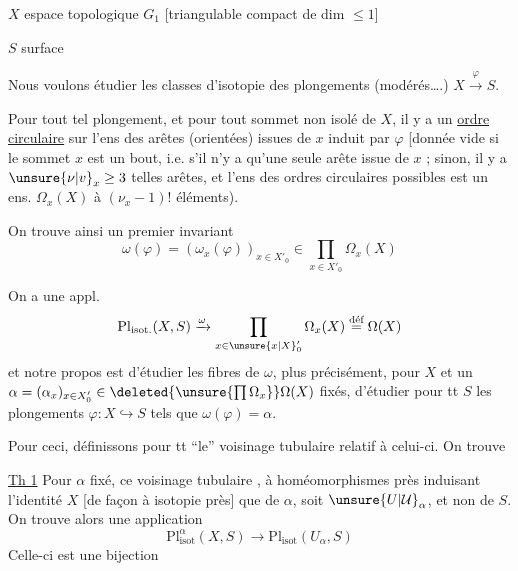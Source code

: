
$X$ espace topologique  $G_1$ [triangulable compact de dim $\leq1$]

$S$ surface 

Nous voulons étudier les classes d'isotopie des plongements (modérés\ldots.) $X\xrightarrow{\varphi}S$.

Pour tout tel plongement\inserted{$\varphi$}, et pour tout sommet   non isolé de $X$, il y a un \uline{ordre circulaire} sur l'ens des arêtes (orientées) issues de $x$ induit par $\varphi$  [donnée vide si le sommet $x$ est un bout, i.e. s'il n'y a qu'une seule arête issue de $x$ ; sinon, il y  a $\unsure{\nu|v}_x\geq3$ telles arêtes, et  l'ens des ordres circulaires possibles est un ens. $\Omega_x(X)$ à $(\nu_x-1)!$ éléments).

On trouve ainsi un premier invariant
\[
 \omega(\varphi)=(\omega_x(\varphi))_{x\in X'_0}\in\prod_{x\in X'_0}\Omega_x(X)
\]

On a une appl.
\[
 \mathrm{Pl}_{\mathrm{isot}.}(X,S)\xrightarrow{\omega}
 \prod_{x\in\unsure{x|X}'_0}\Omega_x(X)\overset{\text{déf}}{=}\Omega(X)
\]
et notre propos est d'étudier les fibres  de $\omega$, plus précisément, pour $X$ et un $\alpha=(\alpha_x)_{x\in X'_0}\in\deleted{\unsure{\prod\Omega_x}}\Omega(X)$ fixés, d'étudier pour tt $S$ les plongements $\varphi:X\hookrightarrow S$ tels que $\omega(\varphi)=\alpha$.

Pour ceci,  définissons pour tt  ``le'' voisinage tubulaire  relatif à celui-ci. On trouve

\uline{Th 1} Pour $\alpha$ fixé, ce voisinage tubulaire , à homéomorphismes près induisant l'identité $X$ [de façon  à isotopie près] que de $\alpha$, soit $\unsure{U|\mathcal U}_\alpha$, et non de $S$.  On trouve alors une application
\[
 \mathrm{Pl}_{\mathrm{isot}}^\alpha(X,S)\longrightarrow\mathrm{Pl}_{\mathrm{isot}}(U_\alpha,S)
\]
Celle-ci est une bijection
